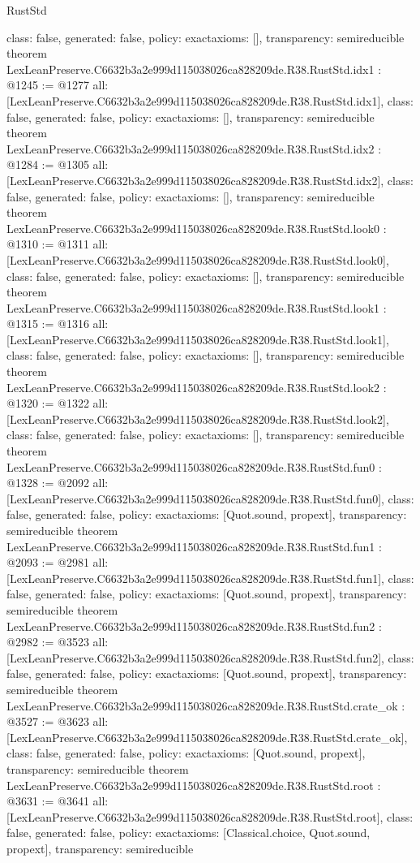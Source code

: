 \begin{lexlean}{RustStd}
\begin{coremodule}
{  class: false,
  generated: false,
  policy: exact{axioms: []},
  transparency: semireducible
}
theorem LexLeanPreserve.C6632b3a2e999d115038026ca828209de.R38.RustStd.idx1 : @1245 := @1277 {
  all: [LexLeanPreserve.C6632b3a2e999d115038026ca828209de.R38.RustStd.idx1],
  class: false,
  generated: false,
  policy: exact{axioms: []},
  transparency: semireducible
}
theorem LexLeanPreserve.C6632b3a2e999d115038026ca828209de.R38.RustStd.idx2 : @1284 := @1305 {
  all: [LexLeanPreserve.C6632b3a2e999d115038026ca828209de.R38.RustStd.idx2],
  class: false,
  generated: false,
  policy: exact{axioms: []},
  transparency: semireducible
}
theorem LexLeanPreserve.C6632b3a2e999d115038026ca828209de.R38.RustStd.look0 : @1310 := @1311 {
  all: [LexLeanPreserve.C6632b3a2e999d115038026ca828209de.R38.RustStd.look0],
  class: false,
  generated: false,
  policy: exact{axioms: []},
  transparency: semireducible
}
theorem LexLeanPreserve.C6632b3a2e999d115038026ca828209de.R38.RustStd.look1 : @1315 := @1316 {
  all: [LexLeanPreserve.C6632b3a2e999d115038026ca828209de.R38.RustStd.look1],
  class: false,
  generated: false,
  policy: exact{axioms: []},
  transparency: semireducible
}
theorem LexLeanPreserve.C6632b3a2e999d115038026ca828209de.R38.RustStd.look2 : @1320 := @1322 {
  all: [LexLeanPreserve.C6632b3a2e999d115038026ca828209de.R38.RustStd.look2],
  class: false,
  generated: false,
  policy: exact{axioms: []},
  transparency: semireducible
}
theorem LexLeanPreserve.C6632b3a2e999d115038026ca828209de.R38.RustStd.fun0 : @1328 := @2092 {
  all: [LexLeanPreserve.C6632b3a2e999d115038026ca828209de.R38.RustStd.fun0],
  class: false,
  generated: false,
  policy: exact{axioms: [Quot.sound, propext]},
  transparency: semireducible
}
theorem LexLeanPreserve.C6632b3a2e999d115038026ca828209de.R38.RustStd.fun1 : @2093 := @2981 {
  all: [LexLeanPreserve.C6632b3a2e999d115038026ca828209de.R38.RustStd.fun1],
  class: false,
  generated: false,
  policy: exact{axioms: [Quot.sound, propext]},
  transparency: semireducible
}
theorem LexLeanPreserve.C6632b3a2e999d115038026ca828209de.R38.RustStd.fun2 : @2982 := @3523 {
  all: [LexLeanPreserve.C6632b3a2e999d115038026ca828209de.R38.RustStd.fun2],
  class: false,
  generated: false,
  policy: exact{axioms: [Quot.sound, propext]},
  transparency: semireducible
}
theorem LexLeanPreserve.C6632b3a2e999d115038026ca828209de.R38.RustStd.crate_ok : @3527 := @3623 {
  all: [LexLeanPreserve.C6632b3a2e999d115038026ca828209de.R38.RustStd.crate_ok],
  class: false,
  generated: false,
  policy: exact{axioms: [Quot.sound, propext]},
  transparency: semireducible
}
theorem LexLeanPreserve.C6632b3a2e999d115038026ca828209de.R38.RustStd.root : @3631 := @3641 {
  all: [LexLeanPreserve.C6632b3a2e999d115038026ca828209de.R38.RustStd.root],
  class: false,
  generated: false,
  policy: exact{axioms: [Classical.choice, Quot.sound, propext]},
  transparency: semireducible
}


\end{coremodule}
\end{lexlean}
